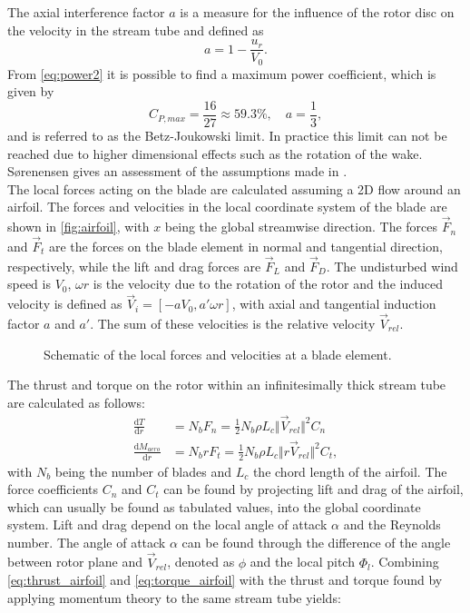The axial interference factor $a$ is a measure for the influence of the rotor disc on the velocity in the stream tube and defined as
\begin{equation}
	a = 1 - \frac{u_r}{V_0}.
\end{equation}
From \eqref{eq:power2} it is possible to find a maximum power coefficient, which is given by
\begin{equation}
		C_{P,max} = \frac{16}{27} \approx 59.3 \%, \quad a = \frac{1}{3} \label{eq:betz-limit},
\end{equation}
and is referred to as the Betz-Joukowski limit. In practice this limit can not be reached due to higher dimensional effects such as the rotation of the wake. Sørenensen gives an assessment of the assumptions made in \cite{sorensen_general_2016}. \cite[p. 7 - 11]{sorensen_general_2016} \\
The local forces acting on the blade are calculated assuming a 2D flow around an airfoil. The forces and velocities in the local coordinate system of the blade are shown in \autoref{fig:airfoil}, with $x$ being the global streamwise direction. The forces $\vec{F}_n$ and $\vec{F}_t$ are the forces on the blade element in normal and tangential direction, respectively, while the lift and drag forces are $\vec{F}_L$ and $\vec{F}_D$. The undisturbed wind speed is $V_0$, $\omega r$ is the velocity due to the rotation of the rotor and the induced velocity is defined as $\vec{V}_i = [-a V_0, a'\omega r]$, with axial and tangential induction factor $a$ and $a'$. The sum of these velocities is the relative velocity $\vec{V}_{rel}$.
\begin{figure}[H]
	\centering
	\def\svgwidth{0.5 \textwidth}
	
	\caption{Schematic of the local forces and velocities at a blade element.}
	\label{fig:airfoil}
\end{figure}
The thrust and torque on the rotor within an infinitesimally thick stream tube are calculated as follows:
\begin{align}
\frac{\mathrm{d}T}{\mathrm{d}r} &=N_b F_n = \frac{1}{2}N_b \rho L_c \Vert \vec{V}_{rel} \Vert^2 C_n \label{eq:thrust_airfoil}\\
\frac{\mathrm{d}M_{aero}}{\mathrm{d}r} &= N_b r F_t = \frac{1}{2} N_b\rho L_c \Vert r \vec{V}_{rel} \Vert^2 C_t, \label{eq:torque_airfoil}
\end{align} with $N_b$ being the number of blades and $L_c$ the chord length of the airfoil. The force coefficients $C_n$ and $C_t$ can be found by projecting lift and drag of the airfoil, which can usually be found as tabulated values, into the global coordinate system. Lift and drag depend on the local angle of attack $\alpha$ and the Reynolds number. The angle of attack $\alpha$ can be found through the difference of the angle between rotor plane and $\vec{V}_{rel}$, denoted as $\phi$ and the local pitch $\Phi_l$. Combining \eqref{eq:thrust_airfoil} and \eqref{eq:torque_airfoil} with the thrust and torque found by applying momentum theory to the same stream tube yields:
